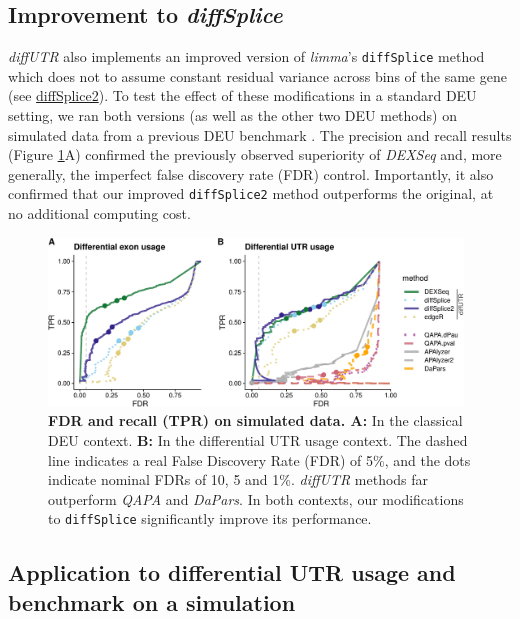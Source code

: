 \documentclass{bmcart}
\begin{document}
\subsection*{Improvement to \textit{diffSplice}}
\textit{diffUTR} also implements an improved version of \textit{limma}'s \texttt{diffSplice} method which does not to assume constant residual variance across bins of the same gene (see \hyperref[sec:diffSplice2]{diffSplice2}). To test the effect of these modifications in a standard DEU setting, we ran both versions (as well as the other two DEU methods) on simulated data from a previous DEU benchmark \cite{Soneson2016IsoformUsage}. The precision and recall results (Figure \ref{fig:pr1}A) confirmed the previously observed superiority of \textit{DEXSeq} and, more generally, the imperfect false discovery rate (FDR) control. Importantly, it also confirmed that our improved \texttt{diffSplice2} method outperforms the original, at no additional computing cost.

\begin{figure}[h]
\includegraphics[width=0.98\textwidth]{figure2.pdf}
\caption{\textbf{FDR and recall (TPR) on simulated data. A:} In the classical DEU context. \textbf{B:} In the differential UTR usage context. The dashed line indicates a real False Discovery Rate (FDR) of 5\%, and the dots indicate nominal FDRs of 10, 5 and 1\%. \textit{diffUTR} methods far outperform \textit{QAPA} and \textit{DaPars}. In both contexts, our modifications to \texttt{diffSplice} significantly improve its performance.}
\label{fig:pr1}
\end{figure}

\subsection*{Application to differential UTR usage and benchmark on a simulation}
\end{document}
